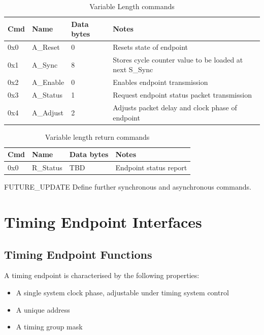 \documentclass[a4paper,11pt]{article}
\begin{document}
\begin{table}[h!]
  \centering
  \begin{tabular}{@{}lllp{9cm}@{}} \toprule
    Cmd & Name & Data bytes & Notes\\ \midrule
    0x0 & A\_Reset & 0 & Resets state of endpoint \\
    0x1 & A\_Sync & 8 & Stores cycle counter value to be loaded at next S\_Sync \\
    0x2 & A\_Enable & 0 & Enables endpoint transmission \\
    0x3 & A\_Status & 1 & Request endpoint status packet transmission \\ 
    0x4 & A\_Adjust & 2 & Adjusts packet delay and clock phase of endpoint \\ \bottomrule
  \end{tabular}
  \caption{Variable Length commands}
  \label{tab:async_cmds}
\end{table}

\begin{table}[h!]
  \centering
  \begin{tabular}{@{}lllp{9cm}@{}} \toprule
    Cmd & Name & Data bytes & Notes\\ \midrule
    0x0 & R\_Status & TBD & Endpoint status report \\ \bottomrule
  \end{tabular}
  \caption{Variable length return commands}
  \label{tab:async_ret_cmds}
\end{table}

{\color{red}FUTURE\_UPDATE} Define further synchronous and asynchronous commands.

\section{Timing Endpoint Interfaces}

\subsection{Timing Endpoint Functions}

A timing endpoint is characterised by the following properties:

\begin{itemize}
	\item A single system clock phase, adjustable under timing system control
	\item A unique address
	\item A timing group mask
\end{itemize}
\end{document}

